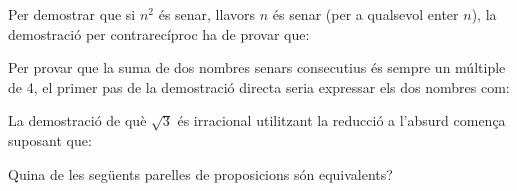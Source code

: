 \begin{enumerate}
\begin{enumerate}
\end{enumerate}
\feedback

\pregunta Per demostrar que si $n^{2}$ és senar, llavors $n$ és senar (per
a qualsevol enter $n$), la demostració per contrarecíproc ha de
provar que:

\begin{enumerate}
\end{enumerate}
\feedback

\pregunta Per provar que la suma de dos nombres senars consecutius és sempre
un múltiple de 4, el primer pas de la demostració directa seria
expressar els dos nombres com:

\begin{enumerate}
\end{enumerate}
\feedback

\pregunta La demostració de què $\sqrt{3}$ és irracional utilitzant la
reducció a l'absurd comença suposant que:

\begin{enumerate}
\end{enumerate}
\feedback

\pregunta Quina de les següents parelles de proposicions són equivalents?


\end{enumerate}
